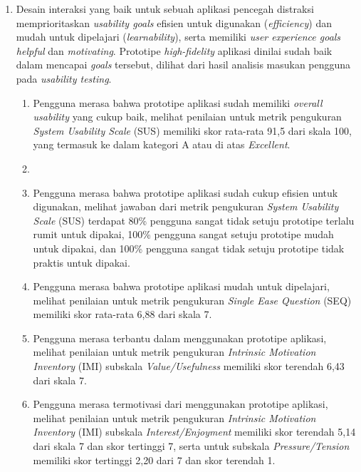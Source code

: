 \begin{enumerate}
  \item Desain interaksi yang baik untuk sebuah aplikasi pencegah distraksi memprioritaskan \textit{usability goals} efisien untuk digunakan (\textit{efficiency}) dan mudah untuk dipelajari (\textit{learnability}), serta memiliki \textit{user experience goals} \textit{helpful} dan \textit{motivating}. Prototipe \textit{high-fidelity} aplikasi dinilai sudah baik dalam mencapai \textit{goals} tersebut, dilihat dari hasil analisis masukan pengguna pada \textit{usability testing}.
    \begin{enumerate}[label=\alph*.]
      \item Pengguna merasa bahwa prototipe aplikasi sudah memiliki \textit{overall usability} yang cukup baik, melihat penilaian untuk metrik pengukuran \textit{System Usability Scale} (SUS) memiliki skor rata-rata 91,5 dari skala 100, yang termasuk ke dalam kategori A atau di atas \textit{Excellent}. 
      \item 
      \item Pengguna merasa bahwa prototipe aplikasi sudah cukup efisien untuk digunakan, melihat jawaban dari metrik pengukuran \textit{System Usability Scale} (SUS) terdapat 80\% pengguna sangat tidak setuju prototipe terlalu rumit untuk dipakai, 100\% pengguna sangat setuju prototipe mudah untuk dipakai, dan 100\% pengguna sangat tidak setuju prototipe tidak praktis untuk dipakai. 
      
      \item Pengguna merasa bahwa prototipe aplikasi mudah untuk dipelajari, melihat penilaian untuk metrik pengukuran \textit{Single Ease Question} (SEQ) memiliki skor rata-rata 6,88 dari skala 7.
      
      \item Pengguna merasa terbantu dalam menggunakan prototipe aplikasi, melihat penilaian untuk metrik pengukuran \textit{Intrinsic Motivation Inventory} (IMI) subskala \textit{Value/Usefulness} memiliki skor terendah 6,43 dari skala 7.
      
      \item Pengguna merasa termotivasi dari menggunakan prototipe aplikasi, melihat penilaian untuk metrik pengukuran \textit{Intrinsic Motivation Inventory} (IMI) subskala \textit{Interest/Enjoyment} memiliki skor terendah 5,14 dari skala 7 dan skor tertinggi 7, serta untuk subskala \textit{Pressure/Tension} memiliki skor tertinggi 2,20 dari 7 dan skor terendah 1.
        

\end{enumerate}
\end{enumerate}
